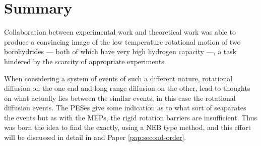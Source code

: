\section{Summary}
\label{sec:borohydrides-summary}

Collaboration between experimental work and theoretical work was able to produce a convincing image of the low temperature rotational motion of two borohydrides --- both of which have very high hydrogen capacity ---, a task hindered by the scarcity of appropriate experiments.

When considering a system of events of such a different nature, rotational diffusion on the one end and long range diffusion on the other, lead to thoughts on what actually lies between the similar events, in this case the rotational diffusion events.
The PESes give some indication as to what sort of  seaparates the events but as with the MEPs, the rigid rotation barriers are insufficient.
Thus was born the idea to find the  exactly, using a NEB type method, and this effort will be discussed in detail in  and Paper \ref{pap:second-order}.

\incomplete
